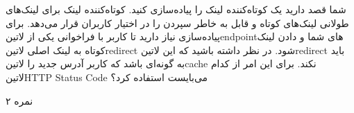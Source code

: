 \documentclass[../main.tex]{subfiles}
\begin{document}

شما قصد دارید یک کوتاه‌کننده لینک را پیاده‌سازی کنید. کوتاه‌کننده لینک برای لینک‌های طولانی لینک‌های کوتاه و قابل به خاطر سپردن را در اختیار کاربران قرار می‌دهد.
برای پیاده‌سازی نیاز دارید تا کاربر با فراخوانی یکی از ‌لاتین{endpoint}های شما و دادن لینک کوتاه به لینک اصلی ‌لاتین{redirect} شود.
در نظر داشته باشید که این ‌لاتین{redirect} باید به گونه‌ای باشد که کاربر آدرس جدید را ‌لاتین{cache} نکند.
برای این امر از کدام ‌لاتین{HTTP Status Code} می‌بایست استفاده کرد؟

۲ نمره
\end{document}
